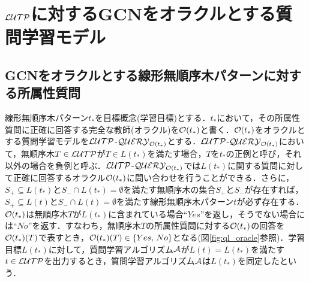 \section{${\cal LUTP}$に対するGCNをオラクルとする質問学習モデル}%




\subsection{GCNをオラクルとする線形無順序木パターンに対する所属性質問}
線形無順序木パターン$t_*$を目標概念(学習目標)とする．$t_*$において，その所属性質問に正確に回答する完全な教師(オラクル)を${\cal O}(t_{\ast})$と書く．${\cal O}(t_*)$をオラクルとする質問学習モデルを${\cal LUTP}$-${\cal QUERY}_{{\cal O}(t_{\ast})}$とする．${\cal LUTP}$-${\cal QUERY}_{{\cal O}(t_{\ast})}$において，無順序木$T\in{\cal LUTP}$が$T\in L(t_{\ast})$を満たす場合，$T$を$t_{\ast}$の正例と呼び，それ以外の場合を負例と呼ぶ．${\cal LUTP}$-${\cal QUERY}_{{\cal O}(t_{\ast})}$では$L(t_*)$に関する質問に対して正確に回答するオラクル${\cal O}(t_{\ast})$に問い合わせを行うことができる．さらに，$S_{+}\subseteq L(t_{\ast})$と$S_{-}\cap L(t_{\ast})=\emptyset$を満たす無順序木の集合$S_+$と$S_-$が存在すれば，$S_{+}\subseteq L(t)$と$S_{-}\cap L(t)=\emptyset$を満たす線形無順序木パターン$t$が必ず存在する．${\cal O}(t_{\ast})$は無順序木$T$が$L(t_{\ast})$に含まれている場合``$Yes$''を返し，そうでない場合には``$No$''を返す．すなわち，無順序木$T$の所属性質問に対する${\cal O}(t_{\ast})$の回答を${\cal O}(t_{\ast})(T)$で表すとき，${\cal O}(t_{\ast})(T)\in\{Yes,\,No\}$となる(図\ref{fig:ql_oracle}参照)．学習目標$L(t_*)$に対して，質問学習アルゴリズム${\cal A}$が$L(t)=L(t_*)$を満たす$t\in {\cal LUTP}$を出力するとき，質問学習アルゴリズム${\cal A}$は$L(t_*)$を同定したという．

